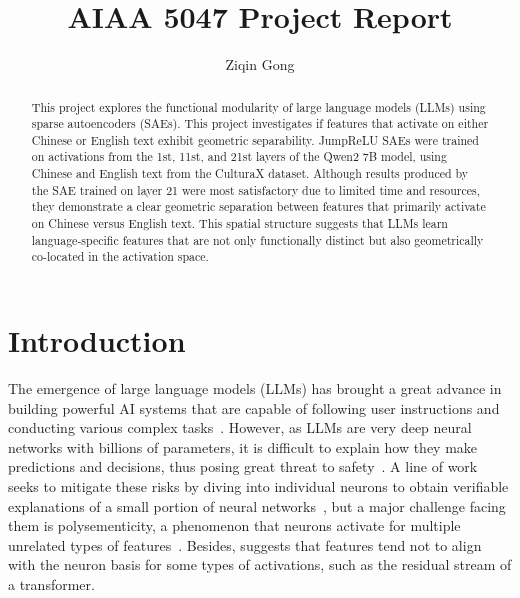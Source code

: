 \documentclass{article}
\title{AIAA 5047 Project Report}
\author{Ziqin Gong}
\date{}
\begin{document}
\maketitle

\begin{abstract}
  This project explores the functional modularity of large language models (LLMs) using sparse
  autoencoders (SAEs). This project investigates if features that activate on either Chinese or
  English text exhibit geometric separability. JumpReLU SAEs were trained on activations from the
  1st, 11st, and 21st layers of the Qwen2 7B model, using Chinese and English text from the CulturaX
  dataset. Although results produced by the SAE trained on layer 21 were most satisfactory due to
  limited time and resources, they demonstrate a clear geometric separation between features that
  primarily activate on Chinese versus English text. This spatial structure suggests that LLMs learn
  language-specific features that are not only functionally distinct but also geometrically
  co-located in the activation space.
\end{abstract}

\section{Introduction}
\label{sec:introduction}

The emergence of large language models (LLMs) has brought a great advance in building powerful AI
systems that are capable of following user instructions and conducting various complex
tasks~\citep{bai2022Constitutional, putta2024Agent, openai2024Learning}. However, as LLMs are very
deep neural networks with billions of parameters, it is difficult to explain how they make
predictions and decisions, thus posing great threat to safety~\citep{hendrycks2023Overview}. A line
of work seeks to mitigate these risks by diving into individual neurons to obtain verifiable
explanations of a small portion of neural networks~\citep{cammarata2021Curve,
  wang2022Interpretability, elhage2021Mathematical}, but a major challenge facing them is
polysementicity, a phenomenon that neurons activate for multiple unrelated types of
features~\citep{olah2020Zoom}. Besides, \cite{elhage2023Privileged} suggests that features tend not
to align with the neuron basis for some types of activations, such as the residual stream of a
transformer.
\end{document}
